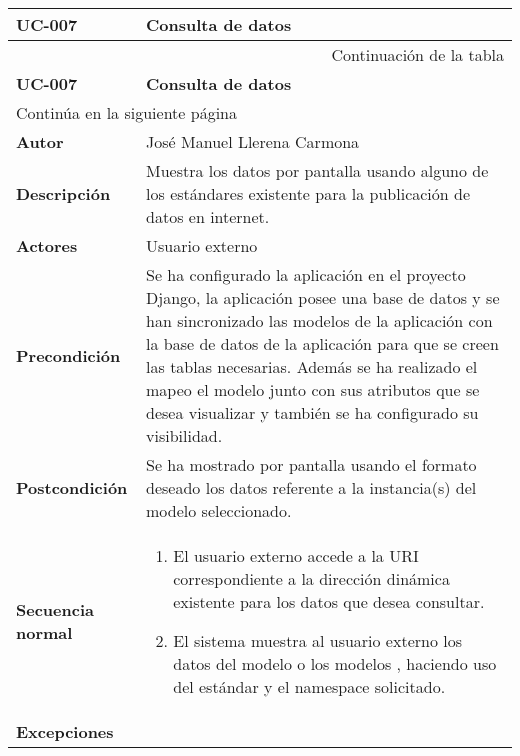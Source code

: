 \begin{center}
\begin{longtable}{||p{3.4cm}|p{12cm}||}
 \hline \hline \bf UC-007 &  \bf Consulta de datos \\
\hline
\endfirsthead
\hline \multicolumn{2}{|r|}{{Continuación de la tabla}} \\ \hline
 \hline \bf UC-007 &  \bf Consulta de datos \\
\hline
\endhead
\hline \multicolumn{2}{|l|}{{Continúa en la siguiente página}} \\ \hline
\endfoot
\endlastfoot
 \hline \bf Autor & José Manuel Llerena Carmona \\
 \hline \bf Descripción & Muestra los datos por pantalla usando alguno de los
             estándares existente para la publicación de datos en internet.\\
 \hline \bf Actores & Usuario externo\\
 \hline \bf Precondición & Se ha configurado la aplicación en el proyecto
             Django, la aplicación posee una base de datos y se han sincronizado
             las modelos de la aplicación con la base de datos de la aplicación
             para que se creen las tablas necesarias. Además se ha realizado el
             mapeo el modelo junto con sus atributos que se desea visualizar y
             también se ha configurado su visibilidad.\\
 \hline \bf Postcondición & Se ha mostrado por pantalla usando el formato
             deseado los datos referente a la instancia(s) del modelo
             seleccionado.\\
 \hline \bf Secuencia normal & 
             \begin{enumerate}
                \item El usuario externo accede a la URI correspondiente a la
                       dirección dinámica existente para los datos que desea
                       consultar.
                \item El sistema muestra al usuario externo los datos del
                       modelo o los modelos , haciendo uso del estándar y el
                       namespace solicitado.
             \end{enumerate}\\
 \hline \bf Excepciones &
             \begin{description}

\end{description}
\end{longtable}
\end{center}

